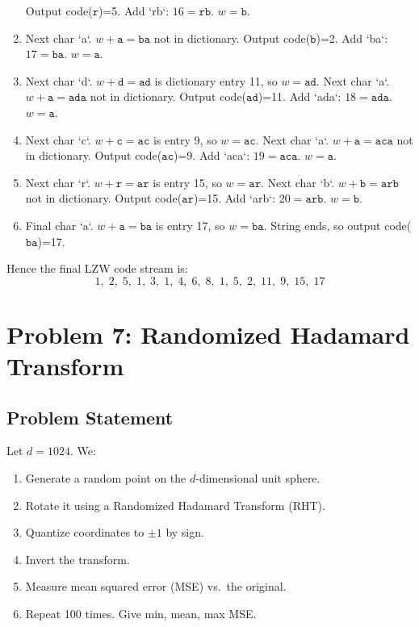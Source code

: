 \documentclass{article}
\begin{document}
\begin{enumerate}
  Output code($\texttt{r}$)=5.  
  Add `rb`: $16=\texttt{rb}$.  
  $w=\texttt{b}$.
\item Next char `a`. $w+\texttt{a}=\texttt{ba}$ not in dictionary.  
  Output code($\texttt{b}$)=2.  
  Add `ba`: $17=\texttt{ba}$.  
  $w=\texttt{a}$.
\item Next char `d`. $w+\texttt{d}=\texttt{ad}$ is dictionary entry 11, so $w=\texttt{ad}$.  
  Next char `a`. $w+\texttt{a}=\texttt{ada}$ not in dictionary.  
  Output code($\texttt{ad}$)=11.  
  Add `ada`: $18=\texttt{ada}$.  
  $w=\texttt{a}$.
\item Next char `c`. $w+\texttt{c}=\texttt{ac}$ is entry 9, so $w=\texttt{ac}$.  
  Next char `a`. $w+\texttt{a}=\texttt{aca}$ not in dictionary.  
  Output code($\texttt{ac}$)=9.  
  Add `aca`: $19=\texttt{aca}$.  
  $w=\texttt{a}$.
\item Next char `r`. $w+\texttt{r}=\texttt{ar}$ is entry 15, so $w=\texttt{ar}$.  
  Next char `b`. $w+\texttt{b}=\texttt{arb}$ not in dictionary.  
  Output code($\texttt{ar}$)=15.  
  Add `arb`: $20=\texttt{arb}$.  
  $w=\texttt{b}$.
\item Final char `a`. $w+\texttt{a}=\texttt{ba}$ is entry 17, so $w=\texttt{ba}$.  
  String ends, so output code($\texttt{ba}$)=17.
\end{enumerate}

Hence the final LZW code stream is:
\[
1,\;2,\;5,\;1,\;3,\;1,\;4,\;6,\;8,\;1,\;5,\;2,\;11,\;9,\;15,\;17
\]

\section{Problem 7: Randomized Hadamard Transform}

\subsection{Problem Statement}
Let $d=1024$. We:
\begin{enumerate}
    \item Generate a random point on the $d$-dimensional unit sphere.
    \item Rotate it using a Randomized Hadamard Transform (RHT).
    \item Quantize coordinates to $\pm 1$ by sign.
    \item Invert the transform.
    \item Measure mean squared error (MSE) vs.\ the original.
    \item Repeat 100 times. Give min, mean, max MSE.
\end{enumerate}
\end{document}
